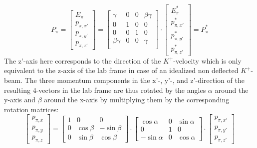 \documentclass[a4paper,parskip,11pt, DIV12]{scrreprt}
\begin{document}
\begin{equation}
P_{\pi} = 
\begin{bmatrix}
E_{\pi} \\ p_{\pi,x'} \\ p_{\pi,y'} \\ p_{\pi,z'}
\end{bmatrix}
=
\begin{bmatrix}
\gamma & 0 & 0 & \beta \gamma \\
0 & 1 & 0 & 0 \\
  0 & 0 & 1 & 0\\
  \beta \gamma & 0 & 0 & \gamma \\
\end{bmatrix}
\cdot
\begin{bmatrix}
E_{\pi}^* \\ p_{\pi,x'}^* \\ p_{\pi,y'}^* \\ p_{\pi,z'}^*
\end{bmatrix} = P^*_{\pi}
\end{equation}
The z'-axis here corresponds to the direction of the $K^+$-velocity which is only equivalent to the z-axis of the lab frame in case of an idealized non deflected $K^+$-beam. The three momentum components in the x'-, y'-, and z'-direction of the resulting 4-vectors in the lab frame are thus rotated by the angles $\alpha$ around the y-axis and $\beta$ around the x-axis by multiplying them by the corresponding rotation matrices:
\begin{equation}
\begin{bmatrix}
p_{\pi,x} \\ p_{\pi,y} \\ p_{\pi,z}
\end{bmatrix}
=
\begin{bmatrix}
1 &   0         & 0           \\
0 & \cos \beta & -\sin \beta \\
0 & \sin \beta &  \cos \beta
\end{bmatrix}
\cdot
\begin{bmatrix}
\cos \alpha  & 0 & \sin \alpha \\
   0         & 1 &  0          \\
-\sin \alpha & 0 & \cos \alpha
\end{bmatrix}
\cdot
\begin{bmatrix}
p_{\pi,x'} \\ p_{\pi,y'} \\ p_{\pi,z'}
\end{bmatrix}
\end{equation}
\end{document}
